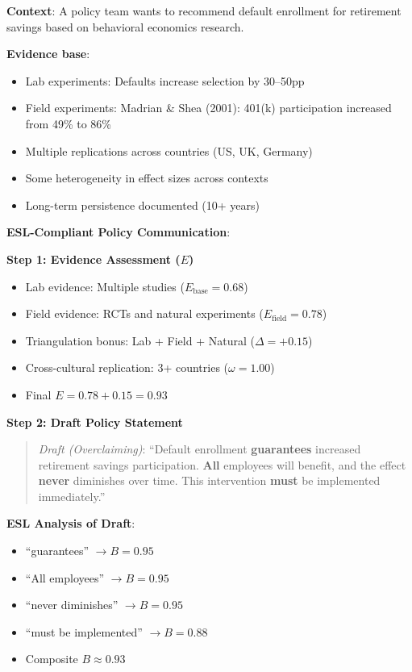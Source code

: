 \documentclass[11pt,a4paper]{article}
\begin{document}
\begin{practicalbox}[title={Scenario: Communicating Behavioral Intervention Effectiveness}]
\textbf{Context}: A policy team wants to recommend default enrollment for retirement savings based on behavioral economics research.

\textbf{Evidence base}:
\begin{itemize}
    \item Lab experiments: Defaults increase selection by 30--50pp
    \item Field experiments: Madrian \& Shea (2001): 401(k) participation increased from 49\% to 86\%
    \item Multiple replications across countries (US, UK, Germany)
    \item Some heterogeneity in effect sizes across contexts
    \item Long-term persistence documented (10+ years)
\end{itemize}
\end{practicalbox}

\textbf{ESL-Compliant Policy Communication}:

\textbf{Step 1: Evidence Assessment ($E$)}
\begin{itemize}
    \item Lab evidence: Multiple studies ($E_{\text{base}} = 0.68$)
    \item Field evidence: RCTs and natural experiments ($E_{\text{field}} = 0.78$)
    \item Triangulation bonus: Lab + Field + Natural ($\Delta = +0.15$)
    \item Cross-cultural replication: 3+ countries ($\omega = 1.00$)
    \item Final $E = 0.78 + 0.15 = 0.93$
\end{itemize}

\textbf{Step 2: Draft Policy Statement}
\begin{quote}
\textit{Draft (Overclaiming)}: ``Default enrollment \textbf{guarantees} increased retirement savings participation. \textbf{All} employees will benefit, and the effect \textbf{never} diminishes over time. This intervention \textbf{must} be implemented immediately.''
\end{quote}

\textbf{ESL Analysis of Draft}:
\begin{itemize}
    \item ``guarantees'' $\to B = 0.95$
    \item ``All employees'' $\to B = 0.95$
    \item ``never diminishes'' $\to B = 0.95$
    \item ``must be implemented'' $\to B = 0.88$
    \item Composite $B \approx 0.93$
\end{itemize}
\end{document}
